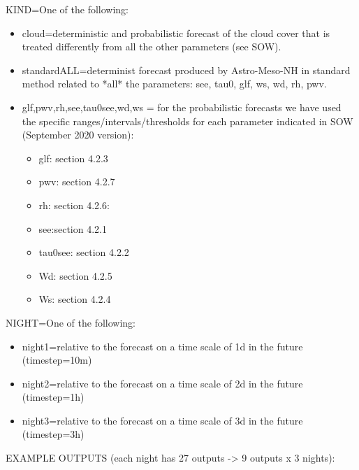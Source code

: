 %
KIND=One of the following:
%
\begin{itemize}	
\item cloud=deterministic and probabilistic forecast of the cloud cover that is treated differently from all the other parameters (see SOW).
\item standardALL=determinist forecast produced by Astro-Meso-NH in standard method related to *all* the parameters: see, tau0, glf, ws, wd, rh, pwv.
\item glf,pwv,rh,see,tau0see,wd,ws = for the probabilistic forecasts we have used the specific ranges/intervals/thresholds for each parameter indicated in SOW (September 2020 version):
\begin{itemize}
\item glf: section 4.2.3
\item pwv: section 4.2.7
\item rh: section 4.2.6:
\item see:section 4.2.1
\item tau0see: section 4.2.2
\item Wd: section 4.2.5
\item Ws: section 4.2.4
\end{itemize}
\end{itemize}
%       
%
%
NIGHT=One of the following:
\begin{itemize}
\item night1=relative to the forecast on a time scale of 1d in the future (timestep=10m)
\item night2=relative to the forecast on a time scale of 2d in the future (timestep=1h)
\item night3=relative to the forecast on a time scale of 3d in the future (timestep=3h)
\end{itemize}
%
%
EXAMPLE OUTPUTS (each night has 27 outputs -> 9 outputs x 3 nights):
